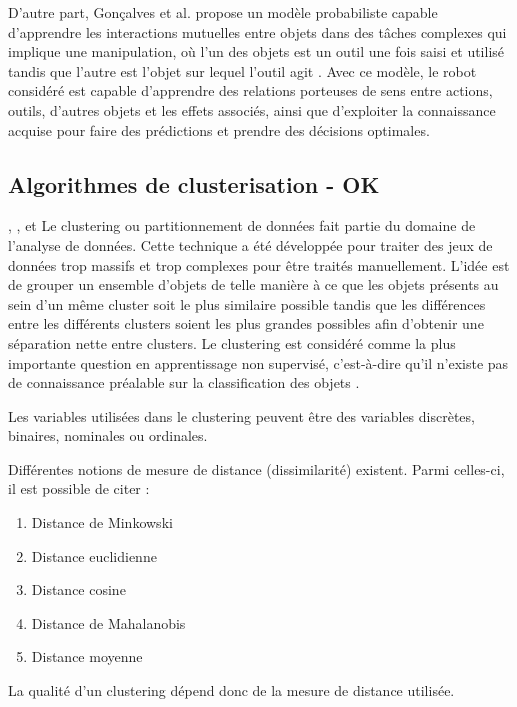\documentclass[draft]{llncs}
\begin{document}
D'autre part, Gonçalves et al. \cite{Goncalves2014} propose un modèle probabiliste capable d'apprendre les interactions mutuelles entre objets dans des tâches complexes qui implique une manipulation, où l'un des objets est un outil une fois saisi et utilisé tandis que l'autre est l'objet sur lequel l'outil agit .
Avec ce modèle, le robot considéré est capable d'apprendre des relations porteuses de sens entre actions, outils, d'autres objets et les effets associés, ainsi que d'exploiter la connaissance acquise pour faire des prédictions et prendre des décisions optimales.




\subsection{Algorithmes de clusterisation - OK}

\cite{Xu2015}, \cite{Andreopoulos2009}, \cite{Fahad2014} \cite{Tan2005} et \cite{Sajana2016}
Le clustering ou partitionnement de données fait partie du domaine de l'analyse de données.
Cette technique a été développée pour traiter des jeux de données trop massifs et trop complexes pour être traités manuellement.
L'idée est de grouper un ensemble d'objets de telle manière à ce que les objets présents au sein d'un même cluster soit le plus similaire possible tandis que les différences entre les différents clusters soient les plus grandes possibles afin d'obtenir une séparation nette entre clusters.
Le clustering est considéré comme la plus importante question en apprentissage non supervisé, c'est-à-dire qu'il n'existe pas de connaissance préalable sur la classification des objets \cite{Xu2015}.

Les variables utilisées dans le clustering peuvent être des variables discrètes, binaires, nominales ou ordinales.

Différentes notions de mesure de distance (dissimilarité) existent. Parmi celles-ci, il est possible de citer :

\begin{enumerate}
  \item Distance de Minkowski
  \item Distance euclidienne
  \item Distance cosine
  \item Distance de Mahalanobis
  \item Distance moyenne
\end{enumerate}

La qualité d'un clustering dépend donc de la mesure de distance utilisée.
\end{document}
